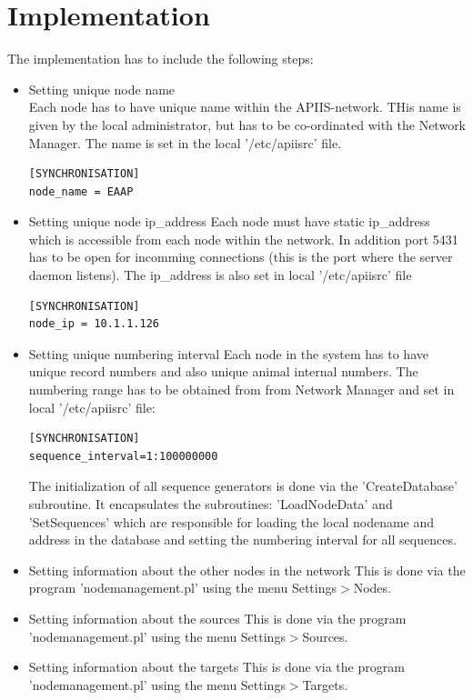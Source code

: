 \section{Implementation}
The implementation has to include the following steps:
\begin{itemize}
\item Setting unique node name\\
Each node has to have unique name within the APIIS-network. THis name is given by the local administrator, but has to be co-ordinated with the Network Manager. The name is set in the local '/etc/apiisrc' file.

\begin{verbatim}
[SYNCHRONISATION]
node_name = EAAP
\end{verbatim} 

\item Setting unique node ip\_address
Each node must have static ip\_address which is accessible from each node within the network. In addition port 5431 has to be open for incomming connections (this is the port where the server daemon listens). The ip\_address is also set in local '/etc/apiisrc' file

\begin{verbatim}
[SYNCHRONISATION]
node_ip = 10.1.1.126
\end{verbatim} 

\item Setting unique numbering interval
Each node in the system has to have unique record numbers and also unique animal internal numbers. The numbering range has to be obtained from from Network Manager and set in local '/etc/apiisrc' file:

\begin{verbatim}
[SYNCHRONISATION]
sequence_interval=1:100000000
\end{verbatim} 

The initialization of all sequence generators is done via the 'CreateDatabase' subroutine. It encapsulates the subroutines: 'LoadNodeData' and 'SetSequences' which are responsible for loading the local nodename and address in the database and setting the numbering interval for all sequences.
\item Setting information about the other nodes in the network
This is done via the program 'nodemanagement.pl' using the menu Settings$>$Nodes.
\item Setting information about the sources
This is done via the program 'nodemanagement.pl' using the menu Settings$>$Sources.
\item Setting information about the targets
This is done via the program 'nodemanagement.pl' using the menu Settings$>$Targets.
\end{itemize}

